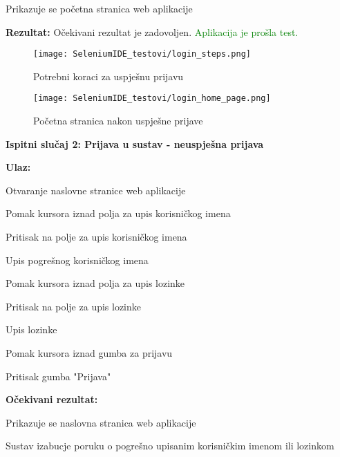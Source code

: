 					\begin{packed_enum}
					
						\item Prikazuje se početna stranica web aplikacije
						
					\end{packed_enum}
				
				\noindent\textbf{Rezultat:} Očekivani rezultat je zadovoljen. \textcolor{green}{Aplikacija je prošla test.}
				
				\begin{figure}[H]
					\texttt{[image: SeleniumIDE\_testovi/login\_steps.png]}
					\centering
					\caption{Potrebni koraci za uspješnu prijavu}
					\label{fig:login_steps}
				\end{figure}
				
				\begin{figure}[H]
					\texttt{[image: SeleniumIDE\_testovi/login\_home\_page.png]}
					\centering
					\caption{Početna stranica nakon uspješne prijave}
					\label{fig:login_home_page}
				\end{figure}

\noindent\textbf{Ispitni slučaj 2: Prijava u sustav - neuspješna prijava}
				
				\noindent\textbf{Ulaz:}
				
					\begin{packed_enum}
					
						\item Otvaranje naslovne stranice web aplikacije
						\item Pomak kursora iznad polja za upis korisničkog imena
						\item Pritisak na polje za upis korisničkog imena
						\item Upis pogrešnog korisničkog imena
						\item Pomak kursora iznad polja za upis lozinke
						\item Pritisak na polje za upis lozinke
						\item Upis lozinke
						\item Pomak kursora iznad gumba za prijavu
						\item Pritisak gumba "Prijava"
						
					\end{packed_enum}
				
				\noindent\textbf{Očekivani rezultat:}
				
					\begin{packed_enum}
					
						\item Prikazuje se naslovna stranica web aplikacije
						\item Sustav izabucje poruku o pogrešno upisanim korisničkim imenom ili lozinkom
						
					\end{packed_enum}
				
